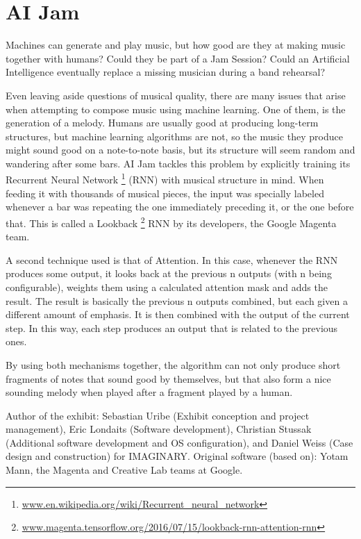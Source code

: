 \section{AI Jam}
Machines can generate and play music, but how good are they at making music together with humans? Could they be part of a Jam Session? Could an Artificial Intelligence eventually replace a missing musician during a band rehearsal?

Even leaving aside questions of musical quality, there are many issues that arise when attempting to compose music using machine learning. One of them, is the generation of a melody. Humans are usually good at producing long-term structures, but machine learning algorithms are not, so the music they produce might sound good on a note-to-note basis, but its structure will seem random and wandering after some bars. AI Jam tackles this problem by explicitly training its Recurrent Neural Network \footnote{\url{www.en.wikipedia.org/wiki/Recurrent_neural_network}} (RNN) with musical structure in mind. When feeding it with thousands of musical pieces, the input was specially labeled whenever a bar was repeating the one immediately preceding it, or the one before that. This is called a Lookback \footnote{\url{www.magenta.tensorflow.org/2016/07/15/lookback-rnn-attention-rnn}} RNN by its developers, the Google Magenta team.

A second technique used is that of Attention. In this case, whenever the RNN produces some output, it looks back at the previous n outputs (with n being configurable), weights them using a calculated attention mask and adds the result. The result is basically the previous n outputs combined, but each given a different amount of emphasis. It is then combined with the output of the current step. In this way, each step produces an output that is related to the previous ones.

By using both mechanisms together, the algorithm can not only produce short fragments of notes that sound good by themselves, but that also form a nice sounding melody when played after a fragment played by a human.

\vfill

Author of the exhibit: Sebastian Uribe (Exhibit conception and project management), Eric Londaits (Software development), Christian Stussak (Additional software development and OS configuration), and Daniel Weiss (Case design and construction) for IMAGINARY.
Original software (based on): Yotam Mann, the Magenta and Creative Lab teams at Google.

